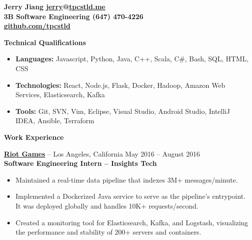 \documentclass{letter}
\begin{document}
  \thispagestyle{empty}


{\bfseries
  {\Large Jerry Jiang} \hfill \href{mailto:jerry@tpcstld.me}{\uline{jerry}}@\href{http://tpcstld.me}{\uline{tpcstld.me}} \\
  3B Software Engineering \hfill (647) 470-4226 \\
\null \hfill \href{https://github.com/tpcstld}{\uline{github.com/tpcstld}}} \\
\null \hrulefill

{\bfseries \Large Technical Qualifications}
\vspace{-3mm}
\begin{itemize}
    \item {\bfseries Languages:}
        Javascript, Python, Java, C++, Scala, C\#, Bash, SQL, HTML, CSS
    \item {\bfseries Technologies:}
        React, Node.js, Flask, Docker, Hadoop, Amazon Web Services,
        Elasticsearch, Kafka
    \item {\bfseries Tools:}
        Git, SVN, Vim, Eclipse, Visual Studio, Android Studio, IntelliJ IDEA,
        Ansible, Terraform
\end{itemize}

{\bfseries \Large Work Experience}

\vspace{-1.5mm}
{\bfseries \href{https://riotgames.com}{\uline{Riot Games}}} -- Los Angeles,
California \hfill May 2016 -- August 2016\\
{\bfseries Software Engineering Intern -- Insights Tech}
\vspace{-3mm}
\begin{itemize}
    \item Maintained a real-time data pipeline that indexes 3M+ messages/minute.
    \item Implemented a Dockerized Java service to serve as the pipeline's
      entrypoint. It was deployed globally and handles 10K+ requests/second.
    \item Created a monitoring tool for Elasticsearch, Kafka, and Logstash,
      visualizing the performance and stability of 200+ servers and containers.
\end{itemize}
\end{document}
